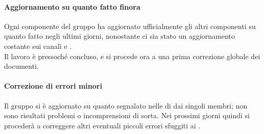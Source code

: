 \documentclass{article}
\begin{document}
\paragraph*{Aggiornamento su quanto fatto finora}
Ogni componente del gruppo ha aggiornato ufficialmente gli altri componenti su quanto fatto negli ultimi giorni, nonostante ci sia stato un aggiornamento costante sui canali  e . \\
Il lavoro è pressoché concluso, e si procede ora a una prima correzione globale dei documenti.

\paragraph*{Correzione di errori minori}
Il gruppo si è aggiornato su quanto segnalato nelle  di  dai singoli membri; non sono risultati problemi o incomprensioni di sorta. Nei prossimi giorni quindi si procederà a correggere altri eventuali piccoli errori sfuggiti ai .
\end{document}
